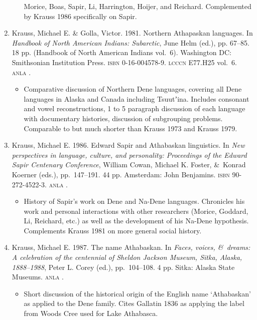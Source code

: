 \documentclass[12pt,letterpaper,oneside,article]{memoir}
\begin{document}
\begin{enumerate}
\begin{itemize}
		Morice, Boas, Sapir, Li, Harrington, Hoijer, and Reichard.
		Complemented by Krauss 1986 specifically on Sapir.
	\end{itemize}
\item	Krauss, Michael E. \& Golla, Victor.
	1981.
	Northern Athapaskan languages.
	In \textit{Handbook of North American Indians: Subarctic},
	June Helm (ed.), pp. 67–85.
	18 pp.
	(Handbook of North American Indians vol.\ 6).
	Washington DC: Smithsonian Institution Press.
	\textsc{isbn} 0-16-004578-9.
	\textsc{lcccn} E77.H25 vol.\ 6.
	\textsc{anla} .
	\begin{itemize}
	\item	Comparative discussion of Northern Dene languages, covering all Dene
		languages in Alaska and Canada including Tsuutʼina.
		Includes consonant and vowel reconstructions,
		1 to 5 paragraph discussion of each language with documentary histories,
		discussion of subgrouping problems.
		Comparable to but much shorter than Krauss 1973 and Krauss 1979.
	\end{itemize}
\item	Krauss, Michael E.
	1986.
	Edward Sapir and Athabaskan linguistics.
	In \textit{New perspectives in language, culture, and personality:
	Proceedings of the Edward Sapir Centenary Conference},
	William Cowan, Michael K. Foster, \&\ Konrad Koerner (eds.),
	pp.\ 147–191.
	44 pp.
	Amsterdam: John Benjamins.
	\textsc{isbn} 90-272-4522-3.
	\textsc{anla} .
	\begin{itemize}
	\item	History of Sapir’s work on Dene and Na-Dene languages.
		Chronicles his work and personal interactions with other researchers (Morice,
		Goddard, Li, Reichard, etc.) as well as the development of his Na-Dene
		hypothesis. Complements Krauss 1981 on more general social history.
	\end{itemize}
\item	Krauss, Michael E.
	1987.
	The name Athabaskan.
	In \textit{Faces, voices, \&\ dreams: A celebration of the centennial of 
		Sheldon Jackson Museum, Sitka, Alaska, 1888–1988}, 
	Peter L. Corey (ed.), pp.\ 104–108.
	4 pp.
	Sitka: Alaska State Museums.
	\textsc{anla} .
	\begin{itemize}
	\item	Short discussion of the historical origin of the English name ‘Athabaskan’
		as applied to the Dene family.
		Cites Gallatin 1836 as applying the label from Woods Cree 
		used for Lake Athabasca.

\end{itemize}
\end{enumerate}
\end{document}
